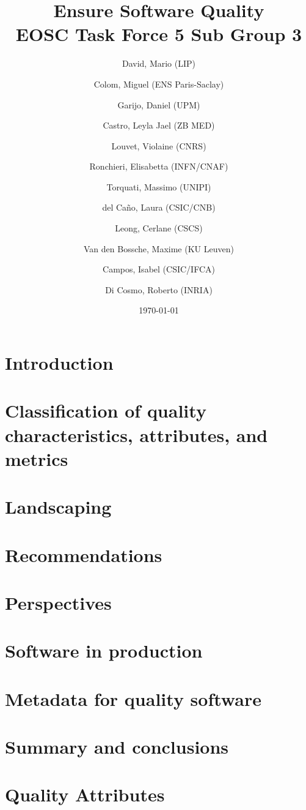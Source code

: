 \documentclass[a4paper]{article}
\title{Ensure Software Quality \\
    \large EOSC Task Force 5 Sub Group 3}
\author{
    David, Mario (LIP) \orcidlink{0000-0003-1802-5356} \and
    Colom, Miguel (ENS Paris-Saclay) \orcidlink{0000-0003-2636-0656} \and
    Garijo, Daniel (UPM) \orcidlink{0000-0003-0454-7145} \and
    Castro, Leyla Jael (ZB MED) \orcidlink{0000-0003-3986-0510} \and
    Louvet, Violaine (CNRS) \orcidlink{0000-0002-8742-8952} \and
    Ronchieri, Elisabetta (INFN/CNAF) \orcidlink{0000-0002-7341-6491} \and
    Torquati, Massimo (UNIPI) \orcidlink{0000-0001-6323-3459} \and
    del Ca\~{n}o, Laura (CSIC/CNB) \orcidlink{0000-0003-0981-2040} \and
    Leong, Cerlane (CSCS)  \orcidlink{0000-0001-8241-6277} \and
    Van den Bossche, Maxime (KU Leuven) \orcidlink{0000-0002-0938-0156} \and
    Campos, Isabel (CSIC/IFCA) \orcidlink{0000-0002-9350-0383} \and
    Di Cosmo, Roberto (INRIA) \orcidlink{0000-0002-7493-5349}
}
\date{\today}
\begin{document}
\maketitle

\tableofcontents
\thispagestyle{empty} 

\clearpage
{} 

\section{Introduction}
\label{sec:introduction}

\newpage

\section{Classification of quality characteristics, attributes, and metrics}
\label{sec:classification}

\newpage

\section{Landscaping}
\label{sec:landscaping}

\newpage

\section{Recommendations}
\label{sec:recommendations}

\newpage

\section{Perspectives}
\label{sec:perspectives}

\newpage

\section{Software in production}
\label{sec:sw_in_prod}

\newpage

\section{Metadata for quality software}
\label{sec:metadata}

\newpage

\section{Summary and conclusions}
\label{sec:summary}

\newpage

\appendix
\section{Quality Attributes}
\label{appendix_qa}


\newpage
\printbibliography
\end{document}
